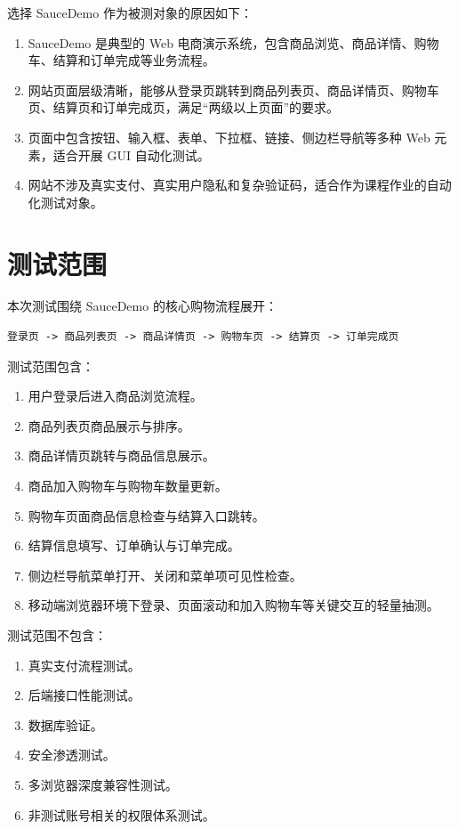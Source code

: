 \documentclass[UTF8,a4paper,12pt]{ctexart}
\begin{document}
选择 SauceDemo 作为被测对象的原因如下：

\begin{enumerate}
  \item SauceDemo 是典型的 Web 电商演示系统，包含商品浏览、商品详情、购物车、结算和订单完成等业务流程。
  \item 网站页面层级清晰，能够从登录页跳转到商品列表页、商品详情页、购物车页、结算页和订单完成页，满足“两级以上页面”的要求。
  \item 页面中包含按钮、输入框、表单、下拉框、链接、侧边栏导航等多种 Web 元素，适合开展 GUI 自动化测试。
  \item 网站不涉及真实支付、真实用户隐私和复杂验证码，适合作为课程作业的自动化测试对象。
\end{enumerate}

\section{测试范围}

本次测试围绕 SauceDemo 的核心购物流程展开：

\begin{lstlisting}
登录页 -> 商品列表页 -> 商品详情页 -> 购物车页 -> 结算页 -> 订单完成页
\end{lstlisting}

测试范围包含：

\begin{enumerate}
  \item 用户登录后进入商品浏览流程。
  \item 商品列表页商品展示与排序。
  \item 商品详情页跳转与商品信息展示。
  \item 商品加入购物车与购物车数量更新。
  \item 购物车页面商品信息检查与结算入口跳转。
  \item 结算信息填写、订单确认与订单完成。
  \item 侧边栏导航菜单打开、关闭和菜单项可见性检查。
  \item 移动端浏览器环境下登录、页面滚动和加入购物车等关键交互的轻量抽测。
\end{enumerate}

测试范围不包含：

\begin{enumerate}
  \item 真实支付流程测试。
  \item 后端接口性能测试。
  \item 数据库验证。
  \item 安全渗透测试。
  \item 多浏览器深度兼容性测试。
  \item 非测试账号相关的权限体系测试。
\end{enumerate}
\end{document}
